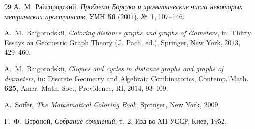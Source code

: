 \documentclass[11pt]{article}
\theoremstyle{definition}
\theoremstyle{remark}
\begin{document}
\begin{thebibliography}{99}
 А.~М.~Райгородский,
\emph{Проблема Борсука и хроматические числа некоторых метрических
пространств}, УМН \textbf{56} ($2001$), №~1, 107--146.

 A.~M.~Raigorodskii,
\emph{Coloring distance graphs and graphs of diameters}, in: Thirty Essays on
Geometric Graph Theory (J.~Pach, ed.), Springer, New York, $2013$, 429--460.

 A.~M.~Raigorodskii,
\emph{Cliques and cycles in distance graphs and graphs of diameters}, in:
Discrete Geometry and Algebraic Combinatorics, Contemp. Math. \textbf{625},
Amer. Math. Soc., Providence, RI, $2014$, 93--109.

 A.~Soifer,
\emph{The Mathematical Coloring Book}, Springer, New York, $2009$.

 Г.~Ф.~Вороной,
\emph{Собрание сочинений}, т.~2, Изд-во АН УССР, Киев, $1952$.

\end{thebibliography}
\end{document}

